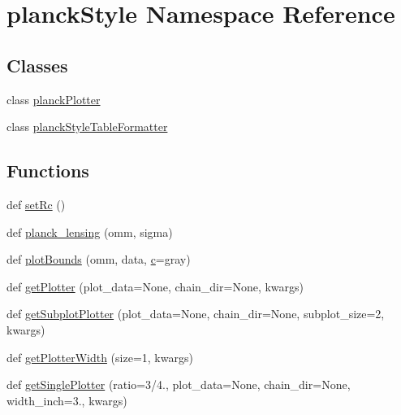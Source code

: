 \hypertarget{namespaceplanckStyle}{}\section{planck\+Style Namespace Reference}
\label{namespaceplanckStyle}
\subsection*{Classes}
\begin{DoxyCompactItemize}
\item 
class \mbox{\hyperlink{classplanckStyle_1_1planckPlotter}{planck\+Plotter}}
\item 
class \mbox{\hyperlink{classplanckStyle_1_1planckStyleTableFormatter}{planck\+Style\+Table\+Formatter}}
\end{DoxyCompactItemize}
\subsection*{Functions}
\begin{DoxyCompactItemize}
\item 
def \mbox{\hyperlink{namespaceplanckStyle_aea86929d119e85a442591b8ab77b2c5b}{set\+Rc}} ()
\item 
def \mbox{\hyperlink{namespaceplanckStyle_a6a5c4a4fc4be0c23e0b51105fe5c5c7c}{planck\+\_\+lensing}} (omm, sigma)
\item 
def \mbox{\hyperlink{namespaceplanckStyle_adfd4d32bbad84e5fec5961598ad40c5f}{plot\+Bounds}} (omm, data, \mbox{\hyperlink{plotTT_8m_ad9d1ac02e33c4aed62ad517a7cb8b3fb}{c}}=\textquotesingle{}gray\textquotesingle{})
\item 
def \mbox{\hyperlink{namespaceplanckStyle_a23e2fe4d18888ae3aa770201a9c07404}{get\+Plotter}} (plot\+\_\+data=None, chain\+\_\+dir=None, kwargs)
\item 
def \mbox{\hyperlink{namespaceplanckStyle_a4fa115fe32762401a5a92d2b637bb8f9}{get\+Subplot\+Plotter}} (plot\+\_\+data=None, chain\+\_\+dir=None, subplot\+\_\+size=2, kwargs)
\item 
def \mbox{\hyperlink{namespaceplanckStyle_a792131eacb97cbce5b33d2120bc07307}{get\+Plotter\+Width}} (size=1, kwargs)
\item 
def \mbox{\hyperlink{namespaceplanckStyle_aee1034b943900d8e5947f01dc644e89d}{get\+Single\+Plotter}} (ratio=3/4., plot\+\_\+data=None, chain\+\_\+dir=None, width\+\_\+inch=3., kwargs)
\end{DoxyCompactItemize}
